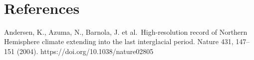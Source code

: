 \documentclass[11pt]{article}
\begin{document}
    \begin{center}
    \end{center}
    { \hspace*{\fill} \\}



    \hypertarget{references}{%
\section*{References}\label{references}}

Andersen, K., Azuma, N., Barnola, J. et al.~High-resolution record of
Northern Hemisphere climate extending into the last interglacial period.
Nature 431, 147--151 (2004). https://doi.org/10.1038/nature02805


\end{document}
